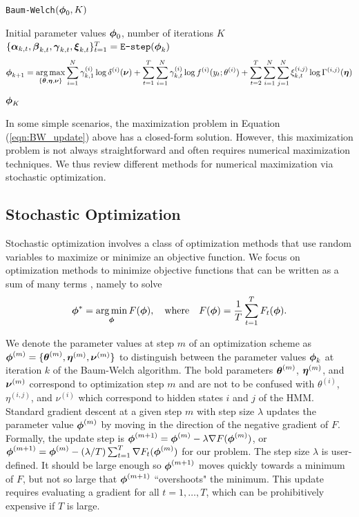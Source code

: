 %
%
%
\begin{algorithm}
\caption{\texttt{Baum-Welch}$(\boldsymbol{\phi}_0,K)$}\label{alg:EM}
\begin{algorithmic}[1]
\Require Initial parameter values $\boldsymbol{\phi}_0$, number of iterations $K$
    \State $\{\boldsymbol{\alpha}_{k,t},\boldsymbol{\beta}_{k,t},\boldsymbol{\gamma}_{k,t},\boldsymbol{\xi}_{k,t}\}_{t=1}^T = \texttt{E-step}(\boldsymbol{\phi}_{k})$  
    \State {} \small $$\boldsymbol{\phi}_{k+1} = \operatorname*{arg\,max}_{\{\boldsymbol{\theta},\boldsymbol{\eta},\boldsymbol{\nu}\}} \sum_{i=1}^N \gamma^{(i)}_{k,1} \log \delta^{(i)}(\boldsymbol{\nu}) + \sum_{t = 1}^T \sum_{i=1}^N \gamma^{(i)}_{k,t} \log f^{(i)}(y_t;\theta^{(i)}) + \sum_{t=2}^{T} \sum_{i=1}^N \sum_{j=1}^N \xi_{k,t}^{(i,j)} \log \Gamma^{(i,j)}(\boldsymbol{\eta})$$ \normalsize
\EndFor
\State \Return $\boldsymbol{\phi}_K$
\end{algorithmic}
\end{algorithm}
%
In some simple scenarios, the maximization problem in Equation (\ref{eqn:BW_update}) above has a closed-form solution. However, this maximization problem is not always straightforward and often requires numerical maximization techniques. We thus review different methods for numerical maximization via stochastic optimization.

\subsection{Stochastic Optimization}
\label{subsec:stoch_optim}

Stochastic optimization involves a class of optimization methods that use random variables to maximize or minimize an objective function. We focus on optimization methods to minimize objective functions that can be written as a sum of many terms \citep{Robbins:1951}, namely to solve
%
\begin{equation}
    \boldsymbol{\phi}^* = \operatorname*{arg\,min}_{\boldsymbol{\phi}} F(\boldsymbol{\phi}), \quad \text{where} \quad F(\boldsymbol{\phi}) = \frac{1}{T}\sum_{t = 1}^T F_t(\boldsymbol{\phi}).
    \label{eqn:stoch_opt}
\end{equation}
%

We denote the parameter values at step $m$ of an optimization scheme as $\boldsymbol{\phi}^{(m)} = \{\boldsymbol{\theta}^{(m)},\boldsymbol{\eta}^{(m)},\boldsymbol{\nu}^{(m)}\}$ to distinguish between the parameter values $\boldsymbol{\phi}_k$ at iteration $k$ of the Baum-Welch algorithm. The bold parameters $\boldsymbol{\theta}^{(m)}$, $\boldsymbol{\eta}^{(m)}$, and $\boldsymbol{\nu}^{(m)}$ correspond to optimization step $m$ and are not to be confused with $\theta^{(i)}$, $\eta^{(i,j)}$, and $\nu^{(i)}$ which correspond to hidden states $i$ and $j$ of the HMM. Standard gradient descent at a given step $m$ with step size $\lambda$ updates the parameter value $\boldsymbol{\phi}^{(m)}$ by moving in the direction of the negative gradient of $F$. Formally, the update step is $\boldsymbol{\phi}^{(m+1)} = \boldsymbol{\phi}^{(m)} - \lambda \nabla F(\boldsymbol{\phi}^{(m)})$, or $\boldsymbol{\phi}^{(m+1)} = \boldsymbol{\phi}^{(m)} - (\lambda/T) \sum_{t=1}^T \nabla F_t(\boldsymbol{\phi}^{(m)})$ for our problem. The step size $\lambda$ is user-defined. It should be large enough so $\boldsymbol{\phi}^{(m+1)}$ moves quickly towards a minimum of $F$, but not so large that $\boldsymbol{\phi}^{(m+1)}$ ``overshoots" the minimum. This update requires evaluating a gradient for all $t = 1,\ldots,T$, which can be prohibitively expensive if $T$ is large.

